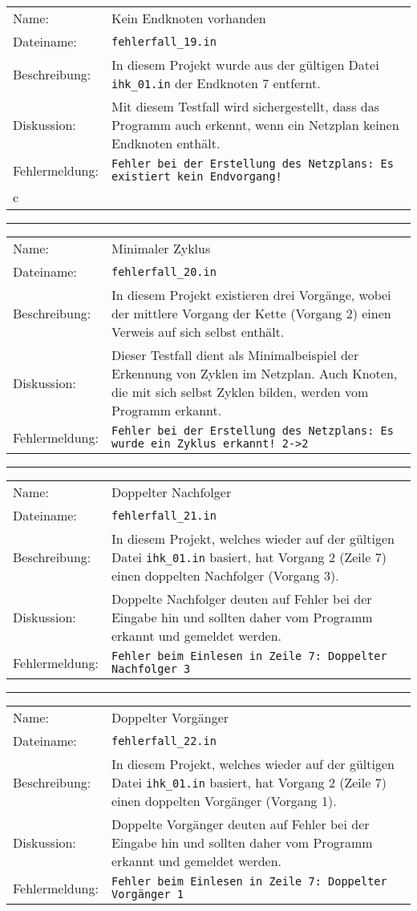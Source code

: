 \begin{tabularx}{\textwidth}{l X}
  Name: & Kein Endknoten vorhanden \\
  Dateiname: & \texttt{fehlerfall\_19.in} \\
  Beschreibung: & In diesem Projekt wurde aus der g\"ultigen Datei
  \texttt{ihk\_01.in} der Endknoten 7 entfernt.\\
  Diskussion: & Mit diesem Testfall wird sichergestellt, dass das
  Programm auch erkennt, wenn ein Netzplan keinen Endknoten
  enth\"alt.\\
  Fehlermeldung: & \texttt{Fehler bei der Erstellung des Netzplans: Es
    existiert kein Endvorgang!} \\c
\end{tabularx}
\hrule
\begin{tabularx}{\textwidth}{l X}
  Name: & Minimaler Zyklus \\
  Dateiname: & \texttt{fehlerfall\_20.in} \\
  Beschreibung: & In diesem Projekt existieren drei Vorg\"ange, wobei
  der mittlere Vorgang der Kette (Vorgang 2) einen Verweis auf sich
  selbst enth\"alt.\\
  Diskussion: & Dieser Testfall dient als Minimalbeispiel der
  Erkennung von Zyklen im Netzplan. Auch Knoten, die mit sich selbst
  Zyklen bilden, werden vom Programm erkannt.\\
  Fehlermeldung: & \texttt{Fehler bei der Erstellung des Netzplans: Es wurde ein Zyklus erkannt!
    2->2} \\
\end{tabularx}
\hrule
\begin{tabularx}{\textwidth}{l X}
  Name: & Doppelter Nachfolger \\
  Dateiname: & \texttt{fehlerfall\_21.in} \\
  Beschreibung: & In diesem Projekt, welches wieder auf der g\"ultigen
  Datei \texttt{ihk\_01.in} basiert, hat Vorgang 2 (Zeile 7) einen doppelten
  Nachfolger (Vorgang 3).\\
  Diskussion: & Doppelte Nachfolger deuten auf Fehler bei der Eingabe
  hin und sollten daher vom Programm erkannt und gemeldet werden.\\
  Fehlermeldung: & \texttt{Fehler beim Einlesen in Zeile 7: Doppelter
    Nachfolger 3} \\
\end{tabularx}
\hrule
\begin{tabularx}{\textwidth}{l X}
  Name: & Doppelter Vorg\"anger \\
  Dateiname: & \texttt{fehlerfall\_22.in} \\
  Beschreibung: & In diesem Projekt, welches wieder auf der g\"ultigen
  Datei \texttt{ihk\_01.in} basiert, hat Vorgang 2 (Zeile 7) einen doppelten
  Vorg\"anger (Vorgang 1).\\
  Diskussion: & Doppelte Vorg\"anger deuten auf Fehler bei der Eingabe
  hin und sollten daher vom Programm erkannt und gemeldet werden.\\
  Fehlermeldung: & \texttt{Fehler beim Einlesen in Zeile 7: Doppelter
    Vorgänger 1} \\
\end{tabularx}

